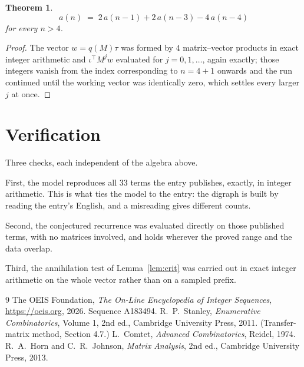 \documentclass[11pt,a4paper]{article}
\theoremstyle{plain}
\newtheorem{theorem}{Theorem}
\theoremstyle{definition}
\begin{document}
\begin{theorem}
\[
a(n)\;=\;2\,a(n-1) + 2\,a(n-3) - 4\,a(n-4)
\]
for every $n>4$.
\end{theorem}

\begin{proof}
The vector $w=q(M)\tau$ was formed by $4$ matrix--vector products in exact integer
arithmetic and $\iota^{\!\top}M^{j}w$ evaluated for $j=0,1,\dots$, again exactly; those
integers vanish from the index corresponding to $n=4+1$ onwards and the run continued
until the working vector was identically zero, which settles every larger $j$ at once.
\end{proof}

\section{Verification}

Three checks, each independent of the algebra above.

First, the model reproduces all $33$ terms the entry publishes, exactly, in integer
arithmetic. This is what ties the model to the entry: the digraph is built by reading the
entry's English, and a misreading gives different counts.

Second, the conjectured recurrence was evaluated directly on those published terms, with no
matrices involved, and holds wherever the proved range and the data overlap.

Third, the annihilation test of Lemma~\ref{lem:crit} was carried out in exact integer
arithmetic on the whole vector rather than on a sampled prefix.

\begin{thebibliography}{9}
 The OEIS Foundation, \emph{The On-Line Encyclopedia of Integer
Sequences}, \url{https://oeis.org}, 2026. Sequence A183494.
 R.~P.~Stanley, \emph{Enumerative Combinatorics}, Volume 1, 2nd ed.,
Cambridge University Press, 2011. (Transfer-matrix method, Section 4.7.)
 L.~Comtet, \emph{Advanced Combinatorics}, Reidel, 1974.
 R.~A.~Horn and C.~R.~Johnson, \emph{Matrix Analysis}, 2nd ed., Cambridge
University Press, 2013.
\end{thebibliography}
\end{document}
